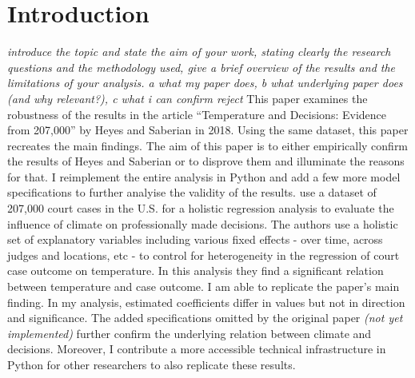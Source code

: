 \documentclass[11pt]{article}
\begin{document}
	\section{Introduction}
	\textit{introduce the topic and state the aim of your work, stating clearly the research questions and the methodology used, give a brief overview of the results and the	limitations of your analysis. a what my paper does, b what underlying paper does (and why relevant?), c what i can confirm reject}
	\newline This paper examines the robustness of the results in the article “Temperature and Decisions: Evidence from 207,000” by Heyes and Saberian in 2018. Using the same dataset, this paper recreates the main findings. The aim of this paper is to either empirically confirm the results of Heyes and Saberian or to disprove them and illuminate the reasons for that. I reimplement the entire analysis in Python and add a few more model specifications to further analyise the validity of the results.
	\newline \cite{Heyes.2019} use a dataset of 207,000 court cases in the U.S. for a holistic regression analysis to evaluate the influence of climate on professionally made decisions. The authors use a holistic set of explanatory variables including various fixed effects - over time, across judges and locations, etc - to control for heterogeneity in the regression of court case outcome on temperature. In this analysis they find a significant relation between temperature and case outcome.
	\newline I am able to replicate the paper’s main finding. In my analysis, estimated coefficients differ in values but not in direction and significance. The added specifications omitted by the original paper \textit{(not yet implemented)} further confirm the underlying relation between climate and decisions. Moreover, I contribute a more accessible technical infrastructure in Python for other researchers to also replicate these results.  
\end{document}
